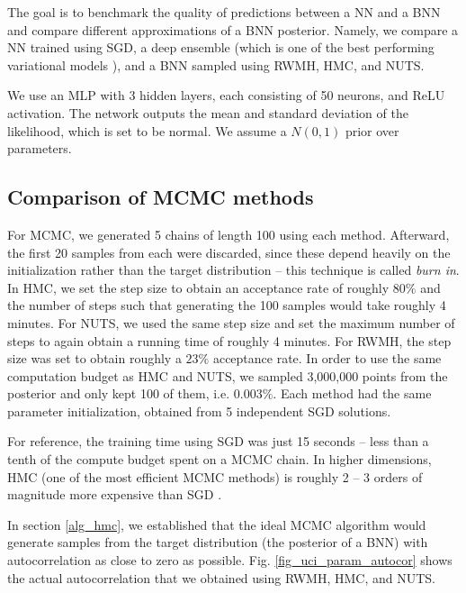 \documentclass[12pt]{article}
\begin{document}
The goal is to benchmark the quality of predictions between a NN and a BNN and compare different approximations of a BNN posterior. Namely, we compare a NN trained using SGD, a deep ensemble (which is one of the best performing variational models \cite{bnn_posterior}), and a BNN sampled using RWMH, HMC, and NUTS.

We use an MLP with 3 hidden layers, each consisting of 50 neurons, and ReLU activation. The network outputs the mean and standard deviation of the likelihood, which is set to be normal. We assume a $N(0, 1)$ prior over parameters.

\subsection{Comparison of MCMC methods}
\label{sec_comp_mcmc}

For MCMC, we generated 5 chains of length 100 using each method. Afterward, the first 20 samples from each were discarded, since these depend heavily on the initialization rather than the target distribution -- this technique is called \textit{burn in}. In HMC, we set the step size to obtain an acceptance rate of roughly $80\%$ and the number of steps such that generating the 100 samples would take roughly 4 minutes. For NUTS, we used the same step size and set the maximum number of steps to again obtain a running time of roughly 4 minutes. For RWMH, the step size was set to obtain roughly a $23\%$ acceptance rate. In order to use the same computation budget as HMC and NUTS, we sampled 3,000,000 points from the posterior and only kept 100 of them, i.e. $0.003\%$. Each method had the same parameter initialization, obtained from 5 independent SGD solutions.

For reference, the training time using SGD was just 15 seconds -- less than a tenth of the compute budget spent on a MCMC chain. In higher dimensions, HMC (one of the most efficient MCMC methods) is roughly 2 -- 3 orders of magnitude more expensive than SGD \cite{bnn_posterior}.

In section \ref{alg_hmc}, we established that the ideal MCMC algorithm would generate samples from the target distribution (the posterior of a BNN) with autocorrelation as close to zero as possible. Fig. \ref{fig_uci_param_autocor} shows the actual autocorrelation that we obtained using RWMH, HMC, and NUTS.
\end{document}

